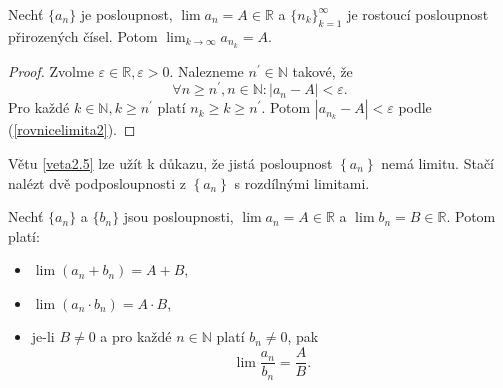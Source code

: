 \begin{veta}\label{veta2.5}
Nechť $\{a_n\}$ je posloupnost, $\lim a_n = A \in \mathbb{R}$ a
$\{n_k\}_{k=1}^{\infty}$ je rostoucí posloupnost přirozených čísel.
Potom $\lim_{k \to \infty} a_{n_k} = A.$
\end{veta}

\begin{proof}
	Zvolme $\varepsilon \in \mathbb R , \varepsilon > 0$. Nalezneme $n^\prime \in \mathbb N $ takové, že
	\begin{equation}\label{rovnicelimita2}
	\forall n \geq n^\prime, n \in \mathbb N : |a_n - A| < \varepsilon.
\end{equation}
    Pro každé $k \in \mathbb N , k \geq n^\prime$ platí $n_k \geq k \geq n^\prime$. Potom $|a_{n_k} -A| < \varepsilon$ podle (\ref{rovnicelimita2}).
\end{proof}

\begin{poznamka}
	Větu \ref{veta2.5} lze užít k důkazu, že jistá posloupnost $\left \{ a_n \right \} $ nemá limitu.
	Stačí nalézt dvě podposloupnosti z $\left \{ a_n \right \} $ s rozdílnými limitami.
\end{poznamka}

\begin{veta} \label{veta2.6}
Nechť $\{a_n\}$ a $\{b_n\}$ jsou posloupnosti, $\lim a_n = A \in \mathbb{R}$ a
$\lim b_n = B \in \mathbb{R}$. Potom platí:
\begin{itemize}
  \item[(a)] $\lim (a_n + b_n) = A + B$,
  \item[(b)] $\lim (a_n \cdot b_n) = A \cdot B$,
  \item[(c)] je-li $B \ne 0$ a pro každé $n \in \mathbb{N}$ platí $b_n \ne 0$, pak
  \[
  \lim \frac{a_n}{b_n} = \frac{A}{B}.
  \]
\end{itemize}
\end{veta}

